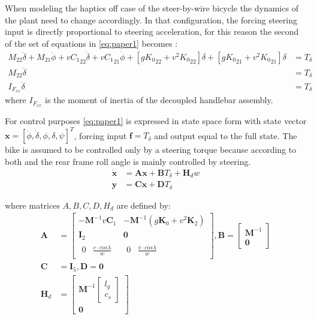 When modeling the haptics off case of the steer-by-wire bicycle the dynamics of the plant need to change accordingly. In that configuration, the forcing steering input is directly proportional to steering acceleration, for this reason the second of the set of equations in \ref{eq:paper1} becomes :
\begin{align}
    M_{22}\ddot{\delta}+ M_{21}\ddot{\phi} + v{C_1}_{22}\dot{\delta} + v{C_1}_{21}\dot{\phi}+[g{K_0}_{22}+v^2{K_0}_{22}]\delta +[g{K_0}_{21}+v^2{K_0}_{21}]\delta &= T_{\delta} \\
    M_{22}\ddot{\delta} &= T_{\delta} \\
    I_{F_{xx}}\ddot{\delta} &= T_{\delta} 
\end{align}
where \ensuremath{I_{F_{xx}}} is the moment of inertia of the  decoupled handlebar assembly.
 
For control purposes \cref{eq:paper1} is expressed in state space form with state vector \ensuremath{\mathbf{x}=[\dot{\phi}, \dot{\delta}, \phi, \delta, \psi]^{T}}, forcing input \ensuremath{\mathbf{f}=T_{\delta}} and output equal to the full state. The  bike is assumed to be controlled only by a steering torque because according to both \citet{moore2012human} and \citet{weir1973manual}  the rear frame roll angle is mainly
 controlled by steering. 
 \begin{align}
    \dot{\mathbf{x}} &=\mathbf{A} \mathbf{x}+\mathbf{B} T_\delta + \mathbf{H}_d w
     \label{eq:bikeEOM1}\\
    \mathbf{y}&=\mathbf{C} \mathbf{x}+\mathbf{D} T_\delta
    \label{eq:bikeEOM2}
\end{align}

where matrices \ensuremath{A,B,C,D,H_d} are defined by:
\begin{align}
    \mathbf{A} &=\begin{bmatrix}
        -\mathbf{M}^{-1}v\mathbf{C}_{1} & -\mathbf{M}^{-1}(g \mathbf{K}_{0}+v^{2}\mathbf{K}_{2}) \\
        {\mathbf{I}_2}                    & {\mathbf{0}} \\  {\begin{matrix} {0} & { \frac{c\cdot cos\lambda}{w}}\end{matrix}} &  {\begin{matrix} 0 & { \frac{v \cdot cos\lambda}{w}}\end{matrix} } 
    \end{bmatrix} , \mathbf{B}=\left[ \begin{array}{c}{\mathbf{M}^{-1}} \\ {\mathbf{0}}\end{array}\right] \\
    \mathbf{C} &= {\mathbf{I}_5} , \mathbf{D}=\mathbf{0} \\
    \mathbf{H}_d &= \left[ \begin{array}{c}{\mathbf{M}^{-1}}{\begin{bmatrix} l_g \\ c_s\end{bmatrix} }  \\ {\mathbf{0}}\end{array}\right] 
\end{align}

